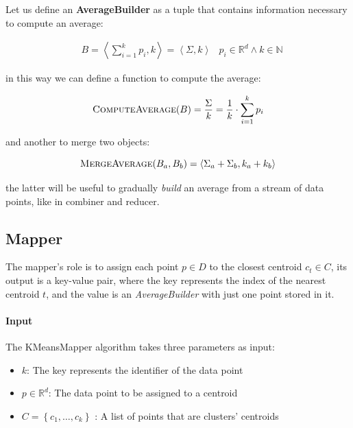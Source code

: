 \documentclass[parskip=full]{report}
\begin{document}
Let us define an \textbf{AverageBuilder} as a tuple that contains information 
necessary to compute an average:

\begin{align}
	\label{def:avgBuild}
& B = \left\langle \sum_{i = 1}^{k} p_i, k\right\rangle =
\left\langle \Sigma, k\right\rangle
&
p_i \in \mathbb{R}^d \land k \in \mathbb{N}
\end{align}

in this way we can define a function to compute the average:

\begin{equation}
\label{computeAvg}
\text{\textsc{ComputeAverage}}(B) = \dfrac{\Sigma}{k}
= \dfrac{1}{k}\cdot\sum_{i = 1}^{k} p_i
\end{equation}

and another to merge two objects:

\begin{equation}
\label{mergeAvg}
\text{\textsc{MergeAverage}}(B_a, B_b) =
\left\langle \Sigma_a + \Sigma_b, k_a + k_b\right\rangle
\end{equation}

the latter will be useful to gradually \textit{build} an average from a stream 
of 
data points, like in combiner and reducer.

\subsection{Mapper}
The mapper's role is to assign each point $p \in D$ to the closest centroid 
$c_t \in C$, its output is a key-value pair, where the key represents the 
index of the nearest centroid $t$, and the value is an \emph{AverageBuilder} 
with just one point stored in it.

\paragraph{Input}
The KMeansMapper algorithm takes three parameters as input:

\begin{itemize}
	\item $k$: The key represents the identifier of the data point
	\item $p \in \mathbb{R}^d$: The data point to be assigned to a centroid
	\item $C = \left\{c_1, \dots, c_k\right\}$ : A list of points that are 
	clusters' centroids
\end{itemize}
\end{document}
